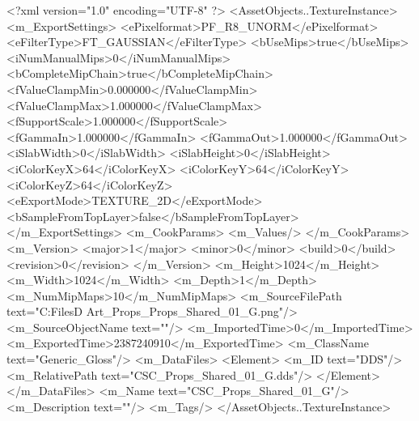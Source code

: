 <?xml version="1.0" encoding="UTF-8" ?>
<AssetObjects..TextureInstance>
	<m_ExportSettings>
		<ePixelformat>PF_R8_UNORM</ePixelformat>
		<eFilterType>FT_GAUSSIAN</eFilterType>
		<bUseMips>true</bUseMips>
		<iNumManualMips>0</iNumManualMips>
		<bCompleteMipChain>true</bCompleteMipChain>
		<fValueClampMin>0.000000</fValueClampMin>
		<fValueClampMax>1.000000</fValueClampMax>
		<fSupportScale>1.000000</fSupportScale>
		<fGammaIn>1.000000</fGammaIn>
		<fGammaOut>1.000000</fGammaOut>
		<iSlabWidth>0</iSlabWidth>
		<iSlabHeight>0</iSlabHeight>
		<iColorKeyX>64</iColorKeyX>
		<iColorKeyY>64</iColorKeyY>
		<iColorKeyZ>64</iColorKeyZ>
		<eExportMode>TEXTURE_2D</eExportMode>
		<bSampleFromTopLayer>false</bSampleFromTopLayer>
	</m_ExportSettings>
	<m_CookParams>
		<m_Values/>
	</m_CookParams>
	<m_Version>
		<major>1</major>
		<minor>0</minor>
		<build>0</build>
		<revision>0</revision>
	</m_Version>
	<m_Height>1024</m_Height>
	<m_Width>1024</m_Width>
	<m_Depth>1</m_Depth>
	<m_NumMipMaps>10</m_NumMipMaps>
	<m_SourceFilePath text="C:\Users\Shadow\Desktop\Working Files\3D Art\Textures\CSC_Props\Current\textures\CSC_Props_Shared_01_G.png"/>
	<m_SourceObjectName text=""/>
	<m_ImportedTime>0</m_ImportedTime>
	<m_ExportedTime>2387240910</m_ExportedTime>
	<m_ClassName text="Generic_Gloss"/>
	<m_DataFiles>
		<Element>
			<m_ID text="DDS"/>
			<m_RelativePath text="CSC_Props_Shared_01_G.dds"/>
		</Element>
	</m_DataFiles>
	<m_Name text="CSC_Props_Shared_01_G"/>
	<m_Description text=""/>
	<m_Tags/>
</AssetObjects..TextureInstance>
